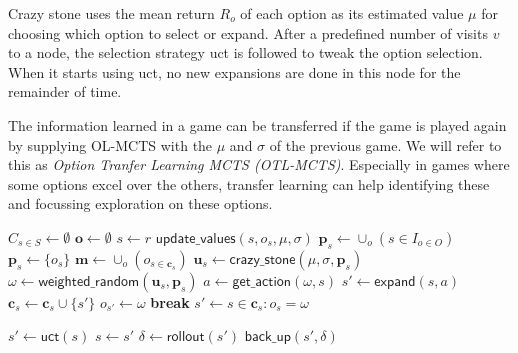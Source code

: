 Crazy stone uses the mean return $R_o$ of each option as its estimated value
$\mu$ for choosing which option to select or expand. After a predefined number
of visits $v$ to a node, the selection strategy \textsf{uct} is followed to
tweak the option selection. When it starts using \textsf{uct}, no new expansions
are done in this node for the remainder of time.

The information learned in a game can be transferred if the game is played
again by supplying OL-MCTS with the $\mu$ and $\sigma$ of the previous game. We
will refer to this as \emph{Option Tranfer Learning MCTS (OTL-MCTS)}. Especially
in games where some options excel over the others, transfer learning can help
identifying these and focussing exploration on these options. 

\begin{algorithm}
	\caption{$\mathsf{OL-MCTS}(O, r, t, d, v, \mu, \sigma)$}
	\label{alg:olmcts}
	\begin{algorithmic}[1]
		\State $C_{s \in S} \gets \emptyset$
		\State $\mathbf{o} \gets \emptyset$
		 \label{alg:olmcts:mainloop}
			\State $s \gets r$
			 \label{alg:olmcts:innerloop}
				 \label{alg:olmcts:sp}
					\State $\mathsf{update\_values}(s, o_s, \mu, \sigma)$ 
					\State $\mathbf{p}_s \gets \cup_o (s \in I_{o \in O})$
				\Else
					\State $\mathbf{p}_s \gets \{o_s\}$
				\EndIf \label{alg:olmcts:scs}
				\State $\mathbf{m} \gets \cup_o (o_{s \in \mathbf{c}_s})$
				 
					\State $\mathbf{u}_s \gets \mathsf{crazy\_stone}(\mu, \sigma, \mathbf{p}_s)$
					\State $\omega \gets \mathsf{weighted\_random}(\mathbf{u}_s, \mathbf{p}_s)$
					 
						\State $a \gets \mathsf{get\_action}(\omega, s)$ 
						\State $s' \gets \mathsf{expand}(s, a)$ 
						\State $\mathbf{c}_s \gets \mathbf{c}_s \cup \{s'\}$
						\State $o_{s'} \gets \omega$
						\State \textbf{break}
					\Else
						\State $s' \gets s \in \mathbf{c}_s : o_s = \omega$
					\EndIf

				\Else \Comment{Apply \textsf{uct}}
					\State $s' \gets \mathsf{uct}(s)$ \label{alg:olmcts:uct}
				\EndIf \label{alg:olmcts:ecs}
				\State $s \gets s'$ \label{alg:olmcts:ss}
			\EndWhile
			\State $\delta \gets \mathsf{rollout}(s')$ \label{alg:olmcts:rollout}
			\State $\mathsf{back\_up}(s', \delta)$ \label{alg:olmcts:backup}
		\EndWhile
	\end{algorithmic}
\end{algorithm}

